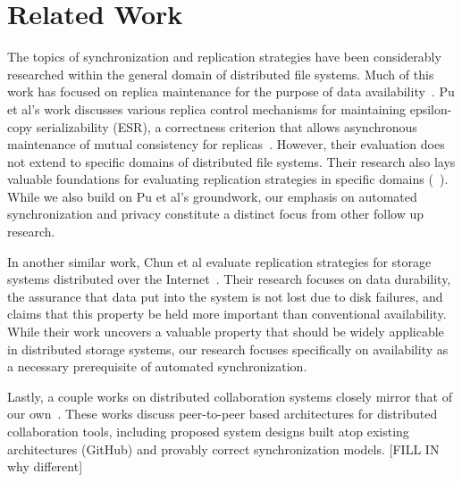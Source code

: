 \section{Related Work}
\label{related}
The topics of synchronization and replication strategies have been considerably researched
within the general domain of distributed file systems.
Much of this work has focused on replica maintenance for the purpose of data availability~\cite{pu1991replica,damani1999optimistic,goel2006data,chun2006replica,ford2010availability}.
Pu et al's work discusses various replica control mechanisms for maintaining epsilon-copy serializability (ESR), 
a correctness criterion that allows asynchronous maintenance of mutual consistency for replicas~\cite{pu1991replica}. 
However, their evaluation does not extend to specific domains of distributed file systems.
Their research also lays valuable foundations for evaluating replication strategies in specific domains (\ie~\cite{ford2010availability}). 
While we also build on Pu et al's groundwork, our emphasis on automated synchronization and privacy constitute a distinct focus from other follow up research.

In another similar work, Chun et al evaluate replication strategies for storage systems distributed over the Internet~\cite{chun2006replica}.
Their research focuses on data durability, the assurance that data put into the system is not lost due to disk failures, and claims that this property be held more important than conventional availability.
While their work uncovers a valuable property that should be widely applicable in distributed storage systems,
our research focuses specifically on availability as a necessary prerequisite of automated synchronization.

Lastly, a couple works on distributed collaboration systems closely mirror that of our own~\cite{oster2006data,merle2012decentralized}.
These works discuss peer-to-peer based architectures for distributed collaboration tools,
including proposed system designs built atop existing architectures (GitHub) and
provably correct synchronization models.
[FILL IN why different]

